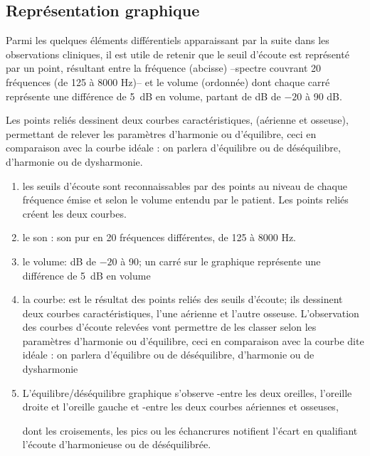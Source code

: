 \subsection{Représentation graphique}

Parmi les quelques éléments différentiels
apparaissant par la suite dans les observations cliniques, il est utile de retenir
que le seuil d'écoute est représenté par un point, résultant entre la
fréquence (abcisse) --spectre couvrant 20
fréquences (de 125 à 8000 Hz)--   et le volume
(ordonnée) dont chaque carré représente une différence de \SI{5}{\dB} en
volume, partant de dB de $-20$ à 90 dB.


Les points reliés dessinent deux courbes caractéristiques, (aérienne
et osseuse), permettant de relever les paramètres d'harmonie ou
          d'équilibre, ceci 
 	en comparaison avec la courbe idéale : on parlera
        d'équilibre ou de
 	déséquilibre, d'harmonie ou de dysharmonie.
        
        \begin{enumerate}
 
  \item   les seuils d'écoute sont reconnaissables par des points au niveau de 
          chaque fréquence émise et selon le volume entendu par le
          patient. Les points reliés créent les deux courbes.
 	\item le son : son pur en 20 fréquences différentes, de 125 à 8000 Hz.   
 	\item le volume: dB de $-20$ à 90; un carré sur le graphique représente une différence de \SI{5}{\dB} en
 		volume 
 	\item la courbe: est le résultat des points reliés des seuils
          d'écoute; ils 
          dessinent deux courbes caractéristiques, l'une aérienne et l'autre osseuse.
          L'observation des courbes d'écoute relevées vont permettre
          de les classer selon les paramètres d'harmonie ou
          d'équilibre, ceci 
 	en comparaison avec la courbe dite idéale : on parlera
        d'équilibre ou de
 	déséquilibre, d'harmonie ou de dysharmonie
        
      \item L'équilibre/déséquilibre graphique s'observe 
        -entre les deux oreilles, l'oreille droite et l'oreille gauche
        et 
        -entre les deux courbes aériennes et osseuses,
        
        dont les 
        croisements, les pics ou les échancrures notifient 
        l'écart en 
        qualifiant l'écoute d'harmonieuse ou de
        déséquilibrée. 
      \end{enumerate}
      
